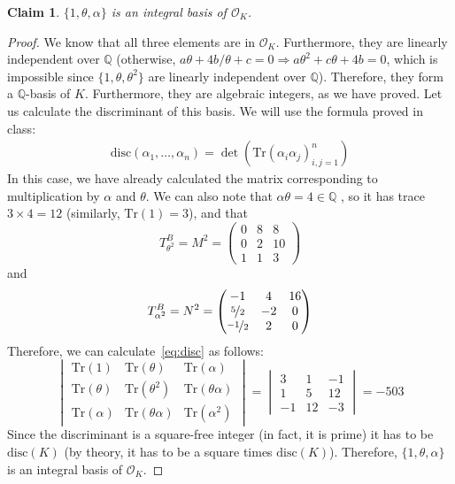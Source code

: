 \documentclass[11pt]{article}
\newtheorem{claim}[theorem]{Claim}
\theoremstyle{definition}
\begin{document}
    \begin{claim}
        $\{1, \theta, \alpha\}$ is an integral basis of $\mathcal{O}_K$.
    \end{claim}
    \begin{proof}
        We know that all three elements are in $\mathcal{O}_K$.
        Furthermore, they are linearly independent over $\mathbb{Q}$
        (otherwise, $a\theta+4b/\theta+c=0 \Rightarrow a\theta^2+c\theta+4b=0$,
        which is impossible since $\{1, \theta, \theta^2\}$ are linearly independent over $\mathbb{Q}$).
        Therefore, they form a $\mathbb{Q}$-basis of $K$.
        Furthermore, they are algebraic integers,
        as we have proved.
        Let us calculate the discriminant of this basis.
        We will use the formula proved in class:
        \begin{align}\label{eq:disc}
            \text{disc}(\alpha_1, \ldots, \alpha_n) = \det(\text{Tr}(\alpha_i\alpha_j)_{i,j=1}^n)
        \end{align}
        In this case, we have already calculated the
        matrix corresponding to multiplication by $\alpha$ and $\theta$.
        We can also note that $\alpha \theta = 4 \in \mathbb{Q}$ ,
        so it has trace $3 \times 4 = 12$ (similarly, $\text{Tr}(1)=3$), and that
        \[T_{\theta^2}^B = M^2 =
            \begin{pmatrix}
                0 & 8 & 8 \\
                0 & 2 & 10 \\
                1 & 1 & 3
            \end{pmatrix}\]
        and
        \[T_{\alpha^2}^B = N^2 =
            \begin{pmatrix}
                -1 & 4 & 16 \\
                \nicefrac{5}{2} & -2 & 0 \\
                \nicefrac{-1}{2} & 2 & 0
            \end{pmatrix}\]
    Therefore, we can calculate~\eqref{eq:disc} as follows:
        \[\begin{vmatrix}
            \text{Tr}(1) & \text{Tr}(\theta) & \text{Tr}(\alpha) \\
            \text{Tr}(\theta) & \text{Tr}(\theta^2) & \text{Tr}(\theta\alpha) \\
            \text{Tr}(\alpha) & \text{Tr}(\theta\alpha) & \text{Tr}(\alpha^2)
        \end{vmatrix}=
        \begin{vmatrix}
            3 & 1 & -1 \\
            1 & 5 & 12 \\
            -1 & 12 & -3
        \end{vmatrix} = -503
        \]
        Since the discriminant is a square-free integer (in fact, it is prime)
        it has to be $\text{disc}(K)$ (by theory, it has to be a square times $\text{disc}(K)$).
        Therefore, $\{1, \theta, \alpha\}$ is an integral basis of $\mathcal{O}_K$.
    \end{proof}
\end{document}
